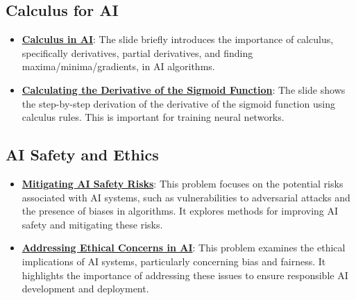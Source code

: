 \documentclass{article}%
\begin{document}
%
\subsection{Calculus for AI}%
\label{subsec:CalculusforAI}%
\begin{itemize}[leftmargin=*]%
\item \href{https://purdue.brightspace.com/d2l/common/assets/pdfjs-d2l-dist/1.0.14-legacy/web/viewer.html?file=%2Fcontent%2Fenforced%2F1095467-wl.202510.CS.24300.001%2F04L1-Linear Algebra Primer.pdf%3Fou%3D1095467&lang=en-us&container=d2l-fileviewer-rendered-pdf&fullscreen=d2l-fileviewer-rendered-pdf-dialog&height=667#page=19}{\textbf{Calculus in AI}}: The slide briefly introduces the importance of calculus, specifically derivatives, partial derivatives, and finding maxima/minima/gradients, in AI algorithms.%
\item \href{https://purdue.brightspace.com/d2l/common/assets/pdfjs-d2l-dist/1.0.14-legacy/web/viewer.html?file=%2Fcontent%2Fenforced%2F1095467-wl.202510.CS.24300.001%2F04L1-Linear Algebra Primer.pdf%3Fou%3D1095467&lang=en-us&container=d2l-fileviewer-rendered-pdf&fullscreen=d2l-fileviewer-rendered-pdf-dialog&height=667#page=21}{\textbf{Calculating the Derivative of the Sigmoid Function}}: The slide shows the step-by-step derivation of the derivative of the sigmoid function using calculus rules. This is important for training neural networks.%
\end{itemize}

%
\subsection{AI Safety and Ethics}%
\label{subsec:AISafetyandEthics}%
\begin{itemize}[leftmargin=*]%
\item \href{https://purdue.brightspace.com/d2l/common/assets/pdfjs-d2l-dist/1.0.14-legacy/web/viewer.html?file=%2Fcontent%2Fenforced%2F1095467-wl.202510.CS.24300.001%2F02L2-Intro.pdf%3Fou%3D1095467&lang=en-us&container=d2l-fileviewer-rendered-pdf&fullscreen=d2l-fileviewer-rendered-pdf-dialog&height=667#page=19}{\textbf{Mitigating AI Safety Risks}}: This problem focuses on the potential risks associated with AI systems, such as vulnerabilities to adversarial attacks and the presence of biases in algorithms. It explores methods for improving AI safety and mitigating these risks.%
\item \href{https://purdue.brightspace.com/d2l/common/assets/pdfjs-d2l-dist/1.0.14-legacy/web/viewer.html?file=%2Fcontent%2Fenforced%2F1095467-wl.202510.CS.24300.001%2F02L2-Intro.pdf%3Fou%3D1095467&lang=en-us&container=d2l-fileviewer-rendered-pdf&fullscreen=d2l-fileviewer-rendered-pdf-dialog&height=667#page=20}{\textbf{Addressing Ethical Concerns in AI}}: This problem examines the ethical implications of AI systems, particularly concerning bias and fairness. It highlights the importance of addressing these issues to ensure responsible AI development and deployment.%
\end{itemize}
\end{document}

